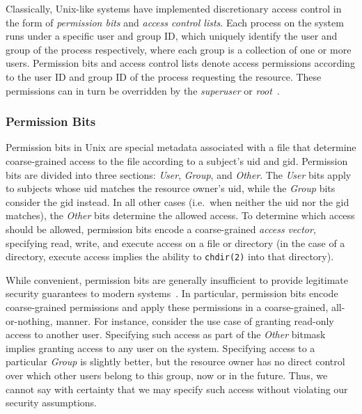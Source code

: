 Classically, Unix-like systems have implemented discretionary access control in the form
of \textit{permission bits} and \textit{access control lists}. Each process on the system
runs under a specific user and group ID, which uniquely identify the user and group of the
process respectively, where each group is a collection of one or more users. Permission
bits and access control lists denote access permissions according to the user ID and group
ID of the process requesting the resource. These permissions can in turn be overridden by
the \textit{superuser} or \textit{root}~\cite{van_oorschot2020_tools_jewels,
jaeger2008_os_security}.

\subsubsection*{Permission Bits}

Permission bits in Unix are special metadata associated with a file that determine
coarse-grained access to the file according to a subject's \gls{uid} and \gls{gid}.
Permission bits are divided into three sections: \textit{User}, \textit{Group}, and
\textit{Other}. The \textit{User} bits apply to subjects whose \gls{uid} matches the
resource owner's \gls{uid}, while the \textit{Group} bits consider the \gls{gid} instead.
In all other cases (i.e.~when neither the \gls{uid} nor the \gls{gid} matches), the
\textit{Other} bits determine the allowed access. To determine which access should be
allowed, permission bits encode a coarse-grained \textit{access vector}, specifying read,
write, and execute access on a file or directory (in the case of a directory, execute
access implies the ability to \texttt{chdir(2)} into that directory).

While convenient, permission bits are generally insufficient to provide legitimate
security guarantees to modern systems~\cite{van_oorschot2020_tools_jewels,
jaeger2008_os_security}. In particular, permission bits encode coarse-grained permissions
and apply these permissions in a coarse-grained, all-or-nothing, manner. For instance,
consider the use case of granting read-only access to another user. Specifying such access
as part of the \textit{Other} bitmask implies granting access to any user on the system.
Specifying access to a particular \textit{Group} is slightly better, but the resource
owner has no direct control over which other users belong to this group, now or in the
future. Thus, we cannot say with certainty that we may specify such access without
violating our security assumptions.

